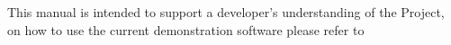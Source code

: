 \documentclass[main.tex]{subfiles}
\begin{document}
  
  This manual is intended to support a developer's understanding of the Project, on how to use the current demonstration software please refer to 
  
\end{document}
